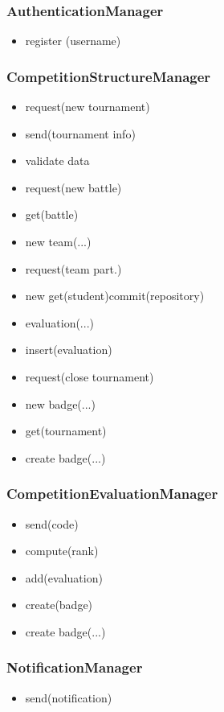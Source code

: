     \subsubsection{AuthenticationManager}
    \begin{itemize}
        \item register (username)
    \end{itemize}
    
    \subsubsection{CompetitionStructureManager}
    \begin{itemize}
        \item request(new tournament)
        \item send(tournament info)
        \item validate data
        \item request(new battle)
        \item get(battle)
        \item new team(...)
        \item request(team part.)
        \item new get(student)commit(repository)
        \item evaluation(...)
        \item insert(evaluation)
        \item request(close tournament)
        \item new badge(...)
        \item get(tournament)
        \item create badge(...)
    \end{itemize}
    
    \subsubsection{CompetitionEvaluationManager}
    \begin{itemize}
        \item send(code)
        \item compute(rank)
        \item add(evaluation)
        \item create(badge)
        \item create badge(...)
    \end{itemize}
    
    \subsubsection{NotificationManager}
    \begin{itemize}
        \item send(notification)
    \end{itemize}
    
